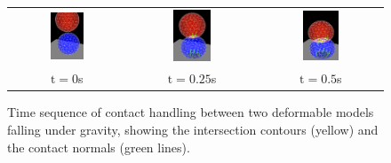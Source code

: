 
\begin{figure}[ht]
\begin{center}
        \begin{tabular}{ccc}
        \includegraphics[width=0.31\textwidth]{images/femCollide1} &
        \includegraphics[width=0.31\textwidth]{images/femCollide2} &
        \includegraphics[width=0.31\textwidth]{images/femCollide3}\\
         \large  $\mathrm{t}=0$s & \large $\mathrm{t}=0.25$s & \large $\mathrm{t}=0.5$s         
        \end{tabular}
\end{center}
\caption{Time sequence of contact handling between two deformable models 
falling under gravity, 
showing the intersection contours
(yellow) and the contact normals (green lines).}
\label{Collision:fig}
\end{figure}


